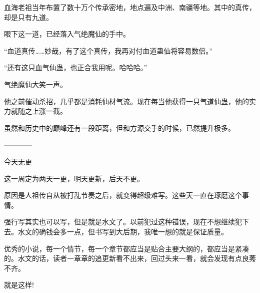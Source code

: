 \begin{this_body}
血海老祖当年布置了数十万个传承密地，地点遍及中洲、南疆等地。其中的真传，却是只有九道。

眼下这一道，已经落入气绝魔仙的手中。

“血道真传……妙哉，有了这个真传，我再对付血道蛊仙将容易数倍。”

“还有这只血气仙蛊，也正合我用呢。哈哈哈。”

气绝魔仙大笑一声。

他之前催动杀招，几乎都是消耗仙材气流。现在每当他获得一只气道仙蛊，他的实力就随之上涨一截。

虽然和历史中的巅峰还有一段距离，但和方源交手的时候，已然提升极多。

------------

今天无更

这一周定为两天一更，明天更新，后天不更。

原因是人祖传自从被打乱节奏之后，就变得超级难写。这些天一直在琢磨这个事情。

强行写其实也可以写，但是就是水文了。以前犯过这种错误，现在不想继续犯下去。水文的确钱会多一点，但书写到大后期，我唯一想的就是保证质量。

优秀的小说，每一个情节，每一个章节都应当是贴合主要大纲的，都应当是紧凑的。水文的话，读者一章章的追更新看不出来，回过头来一看，就会发现有点良莠不齐。

就是这样!

\end{this_body}

